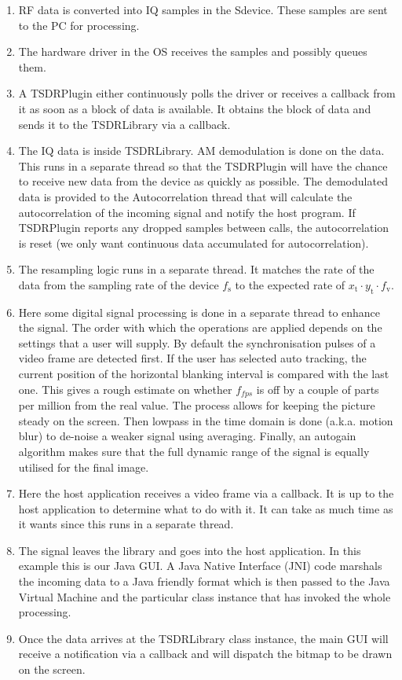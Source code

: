 \documentclass[a4paper,12pt,twoside,openright]{report}
\begin{document}
\begin{enumerate}
	\item RF data is converted into IQ samples in the Sdevice. These samples are sent to the PC for processing.
	\item The hardware driver in the OS receives the samples and possibly queues them.
	\item A TSDRPlugin either continuously polls the driver or receives a callback from it as soon as a block of data is available. It obtains the block of data and sends it to the TSDRLibrary via a callback.
	\item The IQ data is inside TSDRLibrary. AM demodulation is done on the data. This runs in a separate thread so that the TSDRPlugin will have the chance to receive new data from the device as quickly as possible. The demodulated data is provided to the Autocorrelation thread that will calculate the autocorrelation of the incoming signal and notify the host program. If TSDRPlugin reports any dropped samples between calls, the autocorrelation is reset (we only want continuous data accumulated for autocorrelation).
	\item The resampling logic runs in a separate thread. It matches the rate of the data from the sampling rate of the device $f_\text{s}$ to the expected rate of $x_\text{t} \cdot y_\text{t} \cdot f_\text{v}$.
	\item Here some digital signal processing is done in a separate thread to enhance the signal. The order with which the operations are applied depends on the settings that a user will supply. By default the synchronisation pulses of a video frame are detected first. If the user has selected auto tracking, the current position of the horizontal blanking interval is compared with the last one. This gives a rough estimate on whether $f_{fps}$ is off by a couple of parts per million from the real value. The process allows for keeping the picture steady on the screen. Then lowpass in the time domain is done (a.k.a. motion blur) to de-noise a weaker signal using averaging. Finally, an autogain algorithm makes sure that the full dynamic range of the signal is equally utilised for the final image.
	\item Here the host application receives a video frame via a callback. It is up to the host application to determine what to do with it. It can take as much time as it wants since this runs in a separate thread.
	\item The signal leaves the library and goes into the host application. In this example this is our Java GUI. A Java Native Interface (JNI) code marshals the incoming data to a Java friendly format which is then passed to the Java Virtual Machine and the particular class instance that has invoked the whole processing.
	\item Once the data arrives at the TSDRLibrary class instance, the main GUI will receive a notification via a callback and will dispatch the bitmap to be drawn on the screen.
\end{enumerate}
\end{document}
